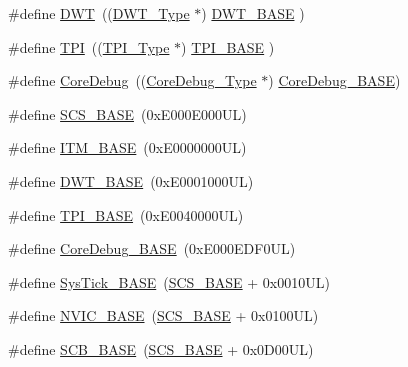 \begin{DoxyCompactItemize}
\item 
\#define \hyperlink{group___c_m_s_i_s__core__base_gabbe5a060185e1d5afa3f85b14e10a6ce}{D\-W\-T}~((\hyperlink{struct_d_w_t___type}{D\-W\-T\-\_\-\-Type}       $\ast$)     \hyperlink{group___c_m_s_i_s__core__base_gafdab534f961bf8935eb456cb7700dcd2}{D\-W\-T\-\_\-\-B\-A\-S\-E}      )
\item 
\#define \hyperlink{group___c_m_s_i_s__core__base_ga8b4dd00016aed25a0ea54e9a9acd1239}{T\-P\-I}~((\hyperlink{struct_t_p_i___type}{T\-P\-I\-\_\-\-Type}       $\ast$)     \hyperlink{group___c_m_s_i_s__core__base_ga2b1eeff850a7e418844ca847145a1a68}{T\-P\-I\-\_\-\-B\-A\-S\-E}      )
\item 
\#define \hyperlink{group___c_m_s_i_s__core__base_gab6e30a2b802d9021619dbb0be7f5d63d}{Core\-Debug}~((\hyperlink{struct_core_debug___type}{Core\-Debug\-\_\-\-Type} $\ast$)     \hyperlink{group___c_m_s_i_s__core__base_ga680604dbcda9e9b31a1639fcffe5230b}{Core\-Debug\-\_\-\-B\-A\-S\-E})
\item 
\#define \hyperlink{group___c_m_s_i_s__core__base_ga3c14ed93192c8d9143322bbf77ebf770}{S\-C\-S\-\_\-\-B\-A\-S\-E}~(0x\-E000\-E000\-U\-L)
\item 
\#define \hyperlink{group___c_m_s_i_s__core__base_gadd76251e412a195ec0a8f47227a8359e}{I\-T\-M\-\_\-\-B\-A\-S\-E}~(0x\-E0000000\-U\-L)
\item 
\#define \hyperlink{group___c_m_s_i_s__core__base_gafdab534f961bf8935eb456cb7700dcd2}{D\-W\-T\-\_\-\-B\-A\-S\-E}~(0x\-E0001000\-U\-L)
\item 
\#define \hyperlink{group___c_m_s_i_s__core__base_ga2b1eeff850a7e418844ca847145a1a68}{T\-P\-I\-\_\-\-B\-A\-S\-E}~(0x\-E0040000\-U\-L)
\item 
\#define \hyperlink{group___c_m_s_i_s__core__base_ga680604dbcda9e9b31a1639fcffe5230b}{Core\-Debug\-\_\-\-B\-A\-S\-E}~(0x\-E000\-E\-D\-F0\-U\-L)
\item 
\#define \hyperlink{group___c_m_s_i_s__core__base_ga58effaac0b93006b756d33209e814646}{Sys\-Tick\-\_\-\-B\-A\-S\-E}~(\hyperlink{group___c_m_s_i_s__core__base_ga3c14ed93192c8d9143322bbf77ebf770}{S\-C\-S\-\_\-\-B\-A\-S\-E} +  0x0010\-U\-L)
\item 
\#define \hyperlink{group___c_m_s_i_s__core__base_gaa0288691785a5f868238e0468b39523d}{N\-V\-I\-C\-\_\-\-B\-A\-S\-E}~(\hyperlink{group___c_m_s_i_s__core__base_ga3c14ed93192c8d9143322bbf77ebf770}{S\-C\-S\-\_\-\-B\-A\-S\-E} +  0x0100\-U\-L)
\item 
\#define \hyperlink{group___c_m_s_i_s__core__base_gad55a7ddb8d4b2398b0c1cfec76c0d9fd}{S\-C\-B\-\_\-\-B\-A\-S\-E}~(\hyperlink{group___c_m_s_i_s__core__base_ga3c14ed93192c8d9143322bbf77ebf770}{S\-C\-S\-\_\-\-B\-A\-S\-E} +  0x0\-D00\-U\-L)

\end{DoxyCompactItemize}
